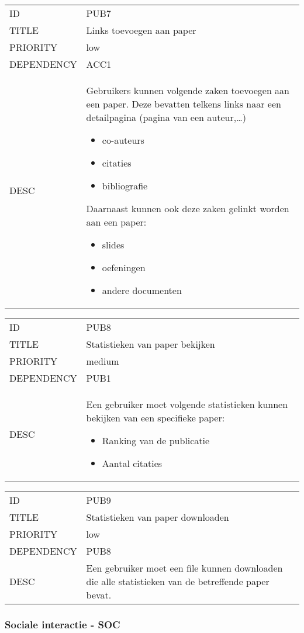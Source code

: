 \begin{longtable}{lp{10cm}}
ID           & PUB7\\
TITLE        & Links toevoegen aan paper\\
PRIORITY     & low\\
DEPENDENCY   & ACC1\\
DESC         & Gebruikers kunnen volgende zaken toevoegen aan een paper. Deze bevatten telkens links naar een detailpagina (pagina van een auteur,\ldots)
\begin{itemize}
\item co-auteurs
\item citaties
\item bibliografie
\end{itemize}
Daarnaast kunnen ook deze zaken gelinkt worden aan een paper:
\begin{itemize}
\item slides
\item oefeningen
\item andere documenten
\end{itemize}     
\end{longtable}

\begin{longtable}{lp{10cm}}
ID           & PUB8\\
TITLE        & Statistieken van paper bekijken\\
PRIORITY     & medium\\
DEPENDENCY   & PUB1\\
DESC         & Een gebruiker moet volgende statistieken kunnen bekijken van een specifieke paper:
\begin{itemize}
\item Ranking van de publicatie
\item Aantal citaties
\end{itemize}     
\end{longtable}

\begin{longtable}{lp{10cm}}
ID           & PUB9\\
TITLE        & Statistieken van paper downloaden\\
PRIORITY     & low\\
DEPENDENCY   & PUB8\\
DESC         & Een gebruiker moet een file kunnen downloaden die alle statistieken van de betreffende paper bevat.     
\end{longtable}

\subsubsection{Sociale interactie - SOC}

